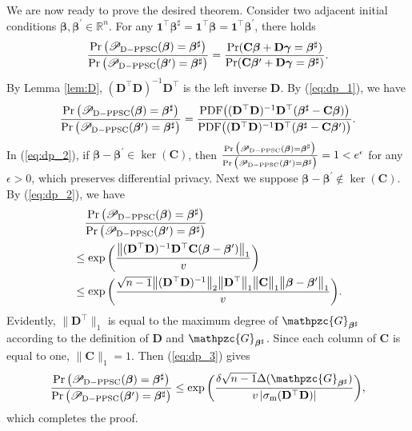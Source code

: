 \documentclass[a4paper, 11pt]{article}
\newcommand{\R}{\mathbb{R}}
\newcommand{\1}{\mathbf{1}}
\newcommand{\Cb}{\mathbf{C}}
\newcommand{\Db}{\mathbf{D}}
\newcommand{\mGM}{\mathpzc{G}}
\newcommand{\gammab}{{\bm \gamma}}
\newcommand{\betab}{\bm{\beta}}
\newcommand{\sigm}{\sigma_{\rm m}}
\begin{document}
We are now ready to prove the desired theorem. 	Consider two adjacent initial conditions $\betab,\betab^\prime\in\R^n$. For any $\1^\top\betab^\sharp=\1^\top\betab=\1^\top\betab^\prime$, there holds
\begin{align}\label{eq:dp_1}
\frac{\Pr\big(\mathscr{P}_{\rm D-PPSC}(\betab)=\betab^\sharp\big)}{\Pr\big(\mathscr{P}_{\rm D-PPSC}(\betab^\prime)=\betab^\sharp\big)}=\frac{\Pr(\Cb\betab+\Db\gammab=\betab^\sharp)}{\Pr(\Cb\betab^\prime+\Db\gammab=\betab^\sharp)}.
\end{align}
By Lemma \ref{lem:D}, $(\Db^\top\Db)^{-1}\Db^\top$ is the left inverse $\Db$. By (\ref{eq:dp_1}), we have
\begin{align}\label{eq:dp_2}
\frac{\Pr\big(\mathscr{P}_{\rm D-PPSC}(\betab)=\betab^\sharp\big)}{\Pr\big(\mathscr{P}_{\rm D-PPSC}(\betab^\prime)=\betab^\sharp\big)}=\frac{{\rm PDF}\big((\Db^\top\Db)^{-1}\Db^\top(\betab^\sharp-\Cb\betab)\big)}{{\rm PDF}\big((\Db^\top\Db)^{-1}\Db^\top(\betab^\sharp-\Cb\betab^\prime)\big)}.
\end{align}
In (\ref{eq:dp_2}), if $\betab-\betab^\prime\in\ker(\Cb)$, then $\frac{\Pr\big(\mathscr{P}_{\rm D-PPSC}(\betab)=\betab^\sharp\big)}{\Pr\big(\mathscr{P}_{\rm D-PPSC}(\betab^\prime)=\betab^\sharp\big)}=1<e^\epsilon$ for any $\epsilon>0$, which preserves differential privacy. Next we suppose $\betab-\betab^\prime\notin\ker(\Cb)$. By (\ref{eq:dp_2}), we have
\begin{align}
&\quad\frac{\Pr\big(\mathscr{P}_{\rm D-PPSC}(\betab)=\betab^\sharp\big)}{\Pr\big(\mathscr{P}_{\rm D-PPSC}(\betab^\prime)=\betab^\sharp\big)}\notag\\
&\le \exp\bigg(\frac{\big\|(\Db^\top\Db)^{-1}\Db^\top\Cb(\betab-\betab^\prime)\big\|_1}{v}\bigg)\notag\\
&\le\exp\bigg(\frac{\sqrt{n-1}\big\|(\Db^\top\Db)^{-1}\big\|_2\big\|\Db^\top\big\|_1\big\|\Cb\big\|_1\big\|\betab-\betab^\prime\big\|_1}{v}\bigg).\label{eq:dp_3}
\end{align}
Evidently, $\|\Db^\top\|_1$ is equal to the maximum degree of $\mGM_{\betab^\sharp}$ according to the definition of $\Db$ and $\mGM_{\betab^\sharp}$. Since each column of $\Cb$ is equal to one, $\|\Cb\|_1=1$. Then (\ref{eq:dp_3}) gives
\begin{align}
\frac{\Pr\big(\mathscr{P}_{\rm D-PPSC}(\betab)=\betab^\sharp\big)}{\Pr\big(\mathscr{P}_{\rm D-PPSC}(\betab^\prime)=\betab^\sharp\big)}\le\exp\bigg(\frac{\delta\sqrt{n-1}\Delta(\mGM_{\betab^\sharp})}{v\left|\sigm(\Db^\top\Db)\right|}\bigg),\notag
\end{align}
which completes the proof.
\end{document}
